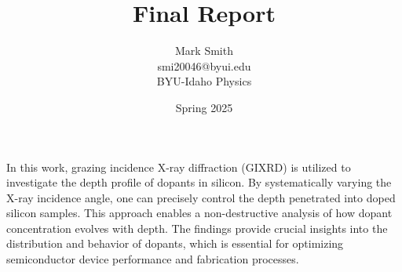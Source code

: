 \documentclass{article}
\title{Final Report}
\author{Mark Smith \vspace{1.5mm} \\ smi20046@byui.edu \vspace{1.5mm} \\ BYU-Idaho Physics}
\date{Spring 2025}
\begin{document}
\maketitle


\section*{}
    In this work, grazing incidence X-ray diffraction (GIXRD) is utilized to investigate the depth profile of dopants in silicon. 
    By systematically varying the X-ray incidence angle, one can precisely control the depth penetrated into doped silicon samples. 
    This approach enables a non-destructive analysis of how dopant concentration evolves with depth. 
    The findings provide crucial insights into the distribution and behavior of dopants, which is essential for optimizing semiconductor device performance and fabrication processes.


\end{document}
